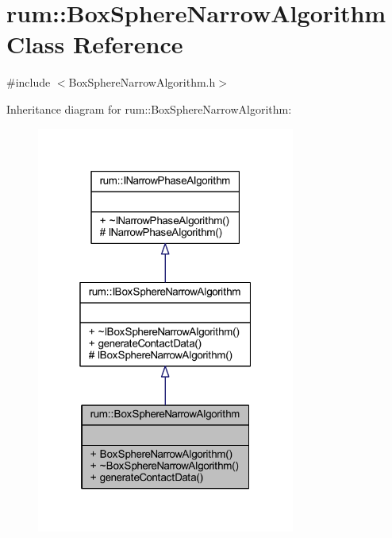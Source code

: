 \hypertarget{classrum_1_1_box_sphere_narrow_algorithm}{}\section{rum\+:\+:Box\+Sphere\+Narrow\+Algorithm Class Reference}
\label{classrum_1_1_box_sphere_narrow_algorithm}


{\ttfamily \#include $<$Box\+Sphere\+Narrow\+Algorithm.\+h$>$}



Inheritance diagram for rum\+:\+:Box\+Sphere\+Narrow\+Algorithm\+:\nopagebreak
\begin{figure}[H]
\begin{center}
\leavevmode
\includegraphics[width=241pt]{classrum_1_1_box_sphere_narrow_algorithm__inherit__graph}
\end{center}
\end{figure}



